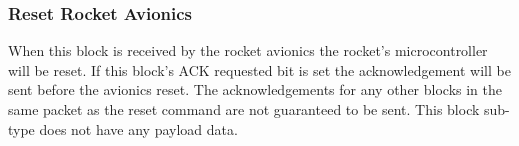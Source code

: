 \subsubsection{Reset Rocket Avionics}

When this block is received by the rocket avionics the rocket’s microcontroller will be reset. If this block’s ACK
requested bit is set the acknowledgement will be sent before the avionics reset. The acknowledgements for any other
blocks in the same packet as the reset command are not guaranteed to be sent. This block sub-type does not have any
payload data.
